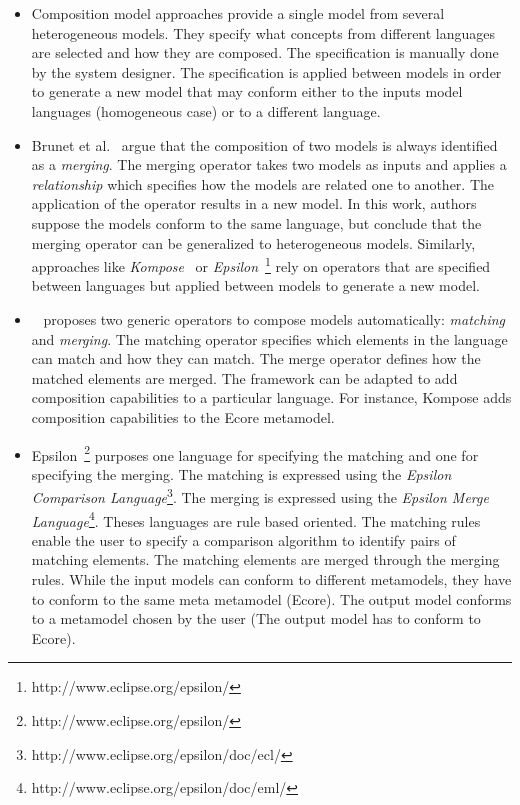     	\begin{itemize}
    		\item Composition model approaches provide a single model from several heterogeneous models. They specify what concepts from different languages are selected and how they are composed. The specification is manually done by the system designer. The specification is applied between models in order to generate a new model that may conform either to the inputs model languages (homogeneous case) or to a different language. 
    		
    		\item Brunet et al.~\cite{mergemanifest} argue that the composition of two models is always identified as a \emph{merging}. The merging operator takes two models as inputs and applies a \emph{relationship} which specifies how the models are related one to another. The application of the operator results in a new model. In this work, authors suppose the models conform to the same language, but conclude that the merging operator can be generalized to heterogeneous models. Similarly, approaches like \emph{Kompose}~\cite{kompose} or \emph{Epsilon}~\cite{epsilon}\footnote{http://www.eclipse.org/epsilon/} rely on operators that are specified between languages but applied between models to generate a new model. 
    		
    		\item ~\cite{kompose} proposes two generic operators to compose models automatically: \emph{matching} and \emph{merging}. The matching operator specifies which elements in the language can match and how they can match. The merge operator defines how the matched elements are merged. The framework can be adapted to add composition capabilities to a particular language. For instance, Kompose adds composition capabilities to the Ecore metamodel.
    		
    		\item Epsilon~\cite{epsilon}\footnote{http://www.eclipse.org/epsilon/} purposes one language for specifying the matching and one for specifying the merging. The matching is expressed using the \emph{Epsilon Comparison Language}\footnote{http://www.eclipse.org/epsilon/doc/ecl/}. The merging is expressed using the \emph{Epsilon Merge Language}\footnote{http://www.eclipse.org/epsilon/doc/eml/}. Theses languages are rule based oriented. The matching rules enable the user to specify a comparison algorithm to identify pairs of matching elements. The matching elements are merged through the merging rules. While the input models can conform to different metamodels, they have to conform to the same meta metamodel (Ecore). The output model conforms to a metamodel chosen by the user (The output model has to conform to Ecore).
    		

\end{itemize}
